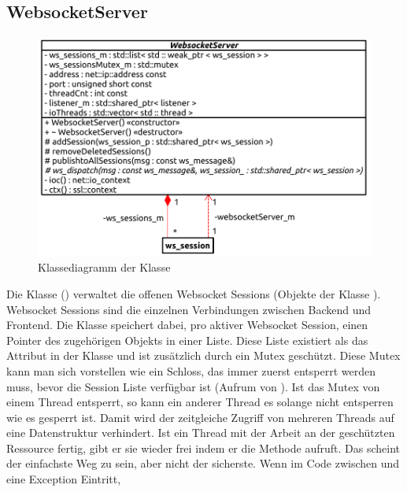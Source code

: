 \subsection{WebsocketServer}
\begin{figure}[ht]
  \centering
  \includegraphics[width=\textwidth]{content/hauptteil/umsetzungPoC/backend/uml/classesOfOverview/WebsocketServer.pdf}
  \caption{Klassediagramm der Klasse }
  \label{fig:backend:classDiag:WebsocketServer}
\end{figure}
Die Klasse  () verwaltet die offenen Websocket Sessions (Objekte der Klasse ). 
Websocket Sessions sind die einzelnen Verbindungen zwischen Backend und Frontend.
Die  Klasse speichert dabei, pro aktiver Websocket Session, einen Pointer des zugehörigen  Objekts in einer Liste.
Diese Liste existiert als das Attribut  in der Klasse  und ist zusätzlich durch ein Mutex geschützt.
Diese Mutex kann man sich vorstellen wie ein Schloss, das immer zuerst entsperrt werden muss, 
bevor die Session Liste verfügbar ist (Aufrum von ). 
Ist das Mutex von einem Thread entsperrt, so kann ein anderer Thread es solange nicht entsperren wie es gesperrt ist.
Damit wird der zeitgleiche Zugriff von mehreren Threads auf eine Datenstruktur verhindert.
Ist ein Thread mit der Arbeit an der geschützten Ressource fertig, gibt er sie wieder frei indem er die Methode  aufruft.
Das scheint der einfachste Weg zu sein, aber nicht der sicherste. 
Wenn im Code zwischen  und  eine Exception Eintritt, 
